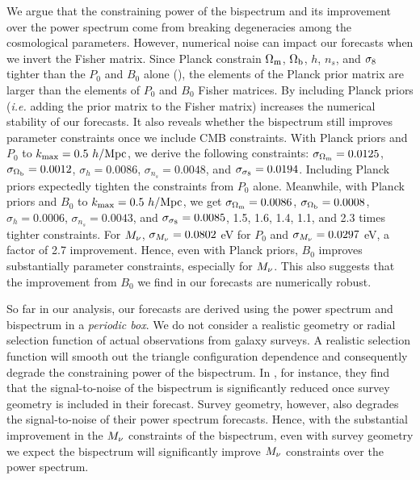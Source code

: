 We argue that the constraining power of the bispectrum and its improvement 
over the power spectrum come from breaking degeneracies among the cosmological 
parameters. However, numerical noise can impact our forecasts when we invert 
the Fisher matrix. Since Planck constrain $\Omega_{\rm m}$, $\Omega_{\rm b}$, $h$, $n_s$, and $\sigma_8$ 
tighter than the $P_0$ and $B_0$ alone (), 
the elements of the Planck prior matrix are larger than the elements of $P_0$ 
and $B_0$ Fisher matrices. By including Planck priors (\emph{i.e.} adding the 
prior matrix to the Fisher matrix) increases the numerical stability of our 
forecasts. It also reveals whether the bispectrum still improves parameter 
constraints once we include CMB constraints. With Planck priors and $P_0$ to 
$k_{\rm max} = 0.5~h/{\rm Mpc}$, we derive the following constraints: 
$\sigma_{\Omega_{\rm m}} = 0.0125$, $\sigma_{\Omega_{\rm b}} = 0.0012$, $\sigma_h=0.0086$, 
$\sigma_{n_s}=0.0048$, and $\sigma_{\sigma_8}=0.0194$. 
Including Planck priors expectedly tighten the constraints from $P_0$ alone. 
Meanwhile, with Planck priors and $B_0$ to $k_{\rm max} = 0.5~h/{\rm Mpc}$, we get 
$\sigma_{\Omega_{\rm m}} = 0.0086$, $\sigma_{\Omega_{\rm b}} = 0.0008$, $\sigma_h=0.0006$, 
$\sigma_{n_s}=0.0043$, and $\sigma_{\sigma_8}=0.0085$, 1.5, 1.6, 1.4, 1.1, and 2.3 
times tighter constraints. For $M_\nu$, $\sigma_{M_\nu} = 0.0802$ eV for $P_0$ 
and $\sigma_{M_\nu} = 0.0297$ eV, a factor of 2.7 improvement.  Hence, even with 
Planck priors, $B_0$ improves substantially parameter constraints, especially for 
$M_\nu$. This also suggests that the improvement from $B_0$ we find in our 
forecasts are numerically robust. 

So far in our analysis, our forecasts are derived using the power spectrum
and bispectrum in a \emph{periodic box}. We do not consider a realistic 
geometry or radial selection function of actual observations from galaxy 
surveys. A realistic selection function will smooth out the triangle 
configuration dependence and consequently degrade the constraining power 
of the bispectrum. In \cite{sefusatti2005}, for instance, they find that the 
signal-to-noise of the bispectrum is significantly reduced once survey geometry 
is included in their forecast. Survey geometry, however, also degrades the 
signal-to-noise of their power spectrum forecasts. Hence, with the substantial 
improvement in the $M_\nu$ constraints of the bispectrum, even with survey 
geometry we expect the bispectrum will significantly improve $M_\nu$ constraints 
over the power spectrum. 

